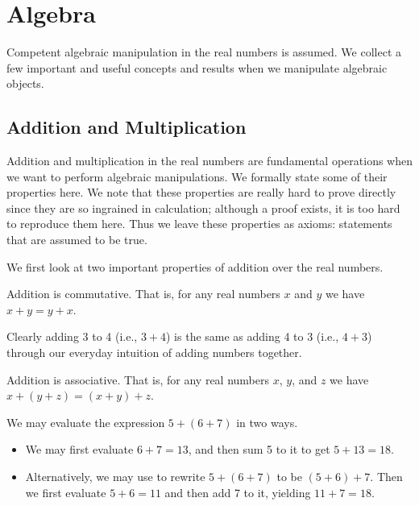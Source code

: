 \chapter{Algebra}
Competent algebraic manipulation in the real numbers is assumed. We collect a few important and useful concepts and results when we manipulate algebraic objects.

\section{Addition and Multiplication}
Addition and multiplication in the real numbers are fundamental operations when we want to perform algebraic manipulations. We formally state some of their properties here. We note that these properties are really hard to prove directly since they are so ingrained in calculation; although a proof exists, it is too hard to reproduce them here. Thus we leave these properties as axioms: statements that are assumed to be true.

We first look at two important properties of addition over the real numbers.
\begin{axiom}\label{axiom-addition-is-commutative}
    Addition is commutative. That is, for any real numbers $x$ and $y$ we have $x + y = y + x$.
\end{axiom}
\begin{example}
    Clearly adding 3 to 4 (i.e., $3 + 4$) is the same as adding 4 to 3 (i.e., $4 + 3$) through our everyday intuition of adding numbers together.
\end{example}

\begin{axiom}\label{axiom-addition-is-associative}
    Addition is associative. That is, for any real numbers $x$, $y$, and $z$ we have $x+(y+z) = (x+y)+z$.
\end{axiom}
\begin{example}
    We may evaluate the expression $5+(6+7)$ in two ways.
    \begin{itemize}
        \item We may first evaluate $6+7 = 13$, and then sum 5 to it to get $5 + 13 = 18$.
        \item Alternatively, we may use  to rewrite $5+(6+7)$ to be $(5+6)+7$. Then we first evaluate $5+6 = 11$ and then add 7 to it, yielding $11 + 7 = 18$.
    \end{itemize}
\end{example}

